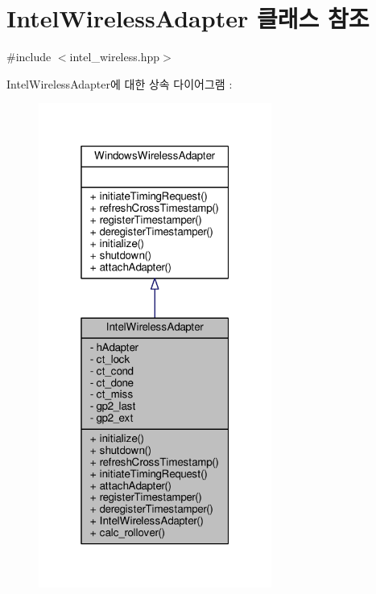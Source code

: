 \hypertarget{class_intel_wireless_adapter}{}\section{Intel\+Wireless\+Adapter 클래스 참조}
\label{class_intel_wireless_adapter}


{\ttfamily \#include $<$intel\+\_\+wireless.\+hpp$>$}



Intel\+Wireless\+Adapter에 대한 상속 다이어그램 \+: 
\nopagebreak
\begin{figure}[H]
\begin{center}
\leavevmode
\includegraphics[width=217pt]{class_intel_wireless_adapter__inherit__graph}
\end{center}
\end{figure}


